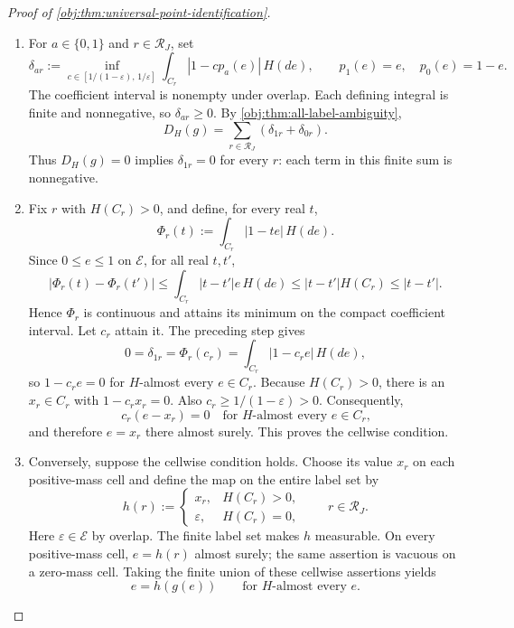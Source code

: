 \documentclass[11pt]{article}
\begin{document}
\begin{proof}[Proof of \cref{obj:thm:universal-point-identification}]
\begin{enumerate}
\item For \(a\in\{0,1\}\) and \(r\in\mathcal R_J\), set
\[
\delta_{ar}:=
\inf_{c\in[1/(1-\varepsilon),\,1/\varepsilon]}
\int_{C_r}|1-cp_a(e)|\,H(de),
\qquad p_1(e)=e,\quad p_0(e)=1-e.
\]
The coefficient interval is nonempty under overlap. Each defining integral is finite and nonnegative, so \(\delta_{ar}\geq0\). By \cref{obj:thm:all-label-ambiguity},
\[
D_H(g)=\sum_{r\in\mathcal R_J}(\delta_{1r}+\delta_{0r}).
\]
Thus \(D_H(g)=0\) implies \(\delta_{1r}=0\) for every \(r\): each term in this finite sum is nonnegative. %

\item Fix \(r\) with \(H(C_r)>0\), and define, for every real \(t\),
\[
\Phi_r(t):=\int_{C_r}|1-te|\,H(de).
\]
Since \(0\leq e\leq1\) on \(\mathcal E\), for all real \(t,t'\),
\[
|\Phi_r(t)-\Phi_r(t')|
\leq \int_{C_r}|t-t'|e\,H(de)
\leq |t-t'|H(C_r)
\leq |t-t'|.
\]
Hence \(\Phi_r\) is continuous and attains its minimum on the compact coefficient interval. Let \(c_r\) attain it. The preceding step gives
\[
0=\delta_{1r}=\Phi_r(c_r)
=\int_{C_r}|1-c_re|\,H(de),
\]
so \(1-c_re=0\) for \(H\)-almost every \(e\in C_r\). Because \(H(C_r)>0\), there is an \(x_r\in C_r\) with \(1-c_rx_r=0\). Also \(c_r\geq1/(1-\varepsilon)>0\). Consequently,
\[
c_r(e-x_r)=0
\quad\text{for \(H\)-almost every \(e\in C_r\),}
\]
and therefore \(e=x_r\) there almost surely. This proves the cellwise condition. %

\item Conversely, suppose the cellwise condition holds. Choose its value \(x_r\) on each positive-mass cell and define the map on the entire label set by
\[
h(r):=
\begin{cases}
x_r,&H(C_r)>0,\\
\varepsilon,&H(C_r)=0,
\end{cases}
\qquad r\in\mathcal R_J.
\]
Here \(\varepsilon\in\mathcal E\) by overlap. The finite label set makes \(h\) measurable. On every positive-mass cell, \(e=h(r)\) almost surely; the same assertion is vacuous on a zero-mass cell. Taking the finite union of these cellwise assertions yields
\[
e=h(g(e))\qquad\text{for \(H\)-almost every \(e\)}.
\]


\end{enumerate}
\end{proof}
\end{document}
